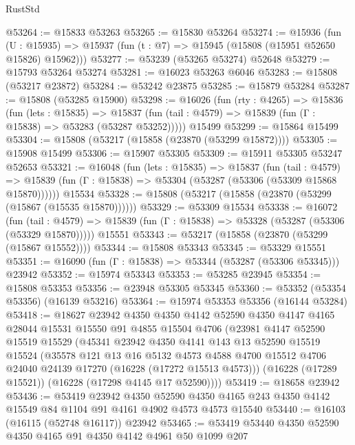 \begin{lexlean}{RustStd}
\begin{coremodule}
@53264 := @15833 @53263
@53265 := @15830 @53264
@53274 := @15936
    (fun (U : @15935) => @15937 (fun (t : @7) => @15945 (@15808 (@15951 @52650 @15826) @15962)))
@53277 := @53239 (@53265 @53274) @52648
@53279 := @15793 @53264 @53274
@53281 := @16023 @53263 @6046
@53283 := @15808 (@53217 @23872)
@53284 := @53242 @23875
@53285 := @15879 @53284
@53287 := @15808 (@53285 @15900)
@53298 := @16026
    (fun (rty : @4265) =>
    @15836
      (fun (lets : @15835) =>
      @15837 (fun (tail : @4579) => @15839 (fun (Γ : @15838) => @53283 (@53287 @53252)))))
    @15499
@53299 := @15864 @15499
@53304 := @15808 (@53217 (@15858 (@23870 (@53299 @15872))))
@53305 := @15908 @15499
@53306 := @15907 @53305
@53309 := @15911 @53305 @53247 @52653
@53321 := @16048
    (fun (lets : @15835) =>
    @15837
      (fun (tail : @4579) =>
      @15839 (fun (Γ : @15838) => @53304 (@53287 (@53306 (@53309 @15868 @15870))))))
    @15534
@53328 := @15808 (@53217 (@15858 (@23870 (@53299 (@15867 (@15535 @15870))))))
@53329 := @53309 @15534
@53338 := @16072
    (fun (tail : @4579) => @15839 (fun (Γ : @15838) => @53328 (@53287 (@53306 (@53329 @15870)))))
    @15551
@53343 := @53217 (@15858 (@23870 (@53299 (@15867 @15552))))
@53344 := @15808 @53343
@53345 := @53329 @15551
@53351 := @16090 (fun (Γ : @15838) => @53344 (@53287 (@53306 @53345))) @23942
@53352 := @15974 @53343
@53353 := @53285 @23945
@53354 := @15808 @53353
@53356 := @23948 @53305 @53345
@53360 := @53352 (@53354 @53356) (@16139 @53216)
@53364 := @15974 @53353 @53356 (@16144 @53284)
@53418 := @18627
    @23942
    @4350
    @4350
    @4142
    @52590
    @4350
    @4147
    @4165
    @28044
    @15531
    @15550
    @91
    @4855
    @15504
    @4706
    (@23981
      @4147
      @52590
      @15519
      @15529
      (@45341
        @23942
        @4350
        @4141
        @143
        @13
        @52590
        @15519
        @15524
        (@35578
          @121
          @13
          @16
          @5132
          @4573
          @4588
          @4700
          @15512
          @4706
          @24040
          @24139
          @17270
          (@16228 (@17272 @15513 @4573)))
        (@16228 (@17289 @15521))
        (@16228 (@17298 @4145 @17 @52590))))
@53419 := @18658 @23942
@53436 := @53419
    @23942
    @4350
    @52590
    @4350
    @4165
    @243
    @4350
    @4142
    @15549
    @84
    @1104
    @91
    @4161
    @4902
    @4573
    @4573
    @15540
@53440 := @16103 (@16115 (@52748 @16117)) @23942
@53465 := @53419
    @53440
    @4350
    @52590
    @4350
    @4165
    @91
    @4350
    @4142
    @4961
    @50
    @1099
    @207

\end{coremodule}
\end{lexlean}
